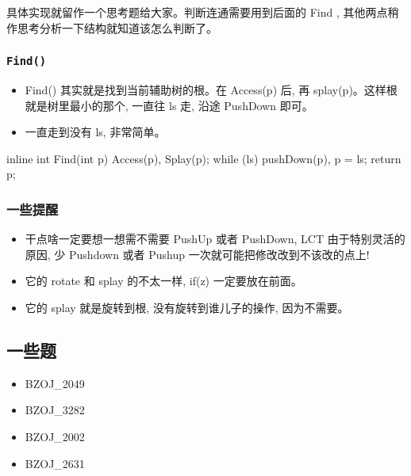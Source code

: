 具体实现就留作一个思考题给大家。判断连通需要用到后面的 Find , 其他两点稍作思考分析一下结构就知道该怎么判断了。

\subsubsection{\texttt{Find()}}

\begin{itemize}
\item Find() 其实就是找到当前辅助树的根。在 Access(p) 后, 再 splay(p)。这样根就是树里最小的那个, 一直往 ls 走, 沿途 PushDown 即可。
\item 一直走到没有 ls, 非常简单。
\end{itemize}

\begin{cppcode}
inline int Find(int p) {
  Access(p), Splay(p);
  while (ls) pushDown(p), p = ls;
  return p;
}
\end{cppcode}

\subsubsection{一些提醒}

\begin{itemize}
\item 干点啥一定要想一想需不需要 PushUp 或者 PushDown, LCT 由于特别灵活的原因, 少 Pushdown 或者 Pushup 一次就可能把修改改到不该改的点上!
\item 它的 rotate 和 splay 的不太一样, if(z) 一定要放在前面。
\item 它的 splay 就是旋转到根, 没有旋转到谁儿子的操作, 因为不需要。
\end{itemize}

\subsection{一些题}

\begin{itemize}
\item BZOJ\_2049 
\item BZOJ\_3282
\item BZOJ\_2002
\item BZOJ\_2631
\end{itemize}
